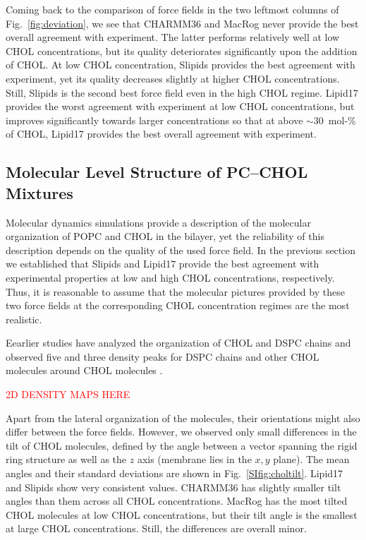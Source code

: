 \documentclass[aps,prl,superscriptaddress]{revtex4-2}
\begin{document}
Coming back to the comparison of force fields in the two leftmost columns of Fig.~\ref{fig:deviation}, we see that CHARMM36 and MacRog never provide the best overall agreement with experiment. The latter performs relatively well at low CHOL concentrations, but its quality deteriorates significantly upon the addition of CHOL. At low CHOL concentration, Slipids provides the best agreement with experiment, yet its quality decreases slightly at higher CHOL concentrations. Still, Slipids is the second best force field even in the high CHOL regime. Lipid17 provides the worst agreement with experiment at low CHOL concentrations, but improves significantly towards larger concentrations so that at above $\sim$30~mol-\% of CHOL, Lipid17 provides the best overall agreement with experiment. 

\subsection{Molecular Level Structure of PC--CHOL Mixtures}

Molecular dynamics simulations provide a description of the molecular organization of POPC and CHOL in the bilayer, yet the reliability of this description depends on the quality of the used force field. In the previous section we established that Slipids and Lipid17 provide the best agreement with experimental properties at low and high CHOL concentrations, respectively. Thus, it is reasonable to assume that the molecular pictures provided by these two force fields at the corresponding CHOL concentration regimes are the most realistic.

Eearlier studies have analyzed the organization of CHOL and DSPC chains and observed five and three density peaks for DSPC chains and other CHOL molecules around CHOL molecules \cite{martinez2010cholesterol}. 

\textcolor{red}{2D DENSITY MAPS HERE}

Apart from the lateral organization of the molecules, their orientations might also differ between the force fields. However, we observed only small differences in the tilt of CHOL molecules, defined by the angle between a vector spanning the rigid ring structure as well as the $z$ axis (membrane lies in the $x,y$ plane). The mean angles and their standard deviations are shown in Fig.~\ref{SIfig:choltilt}. Lipid17 and Slipids show very consistent values. CHARMM36 has slightly smaller tilt angles than them across all CHOL concentrations. MacRog has the most tilted CHOL molecules at low CHOL concentrations, but their tilt angle is the smallest at large CHOL concentrations. Still, the differences are overall minor.
\end{document}
